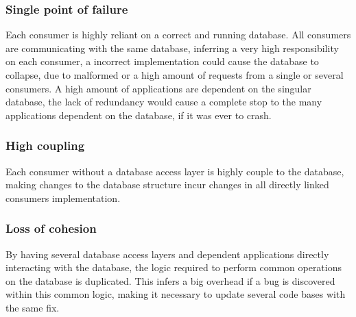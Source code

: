 
\subsubsection{Single point of failure}
Each consumer is highly reliant on a correct and running database. All consumers are communicating with the same database, inferring a very high responsibility on each consumer, a incorrect implementation could cause the database to collapse, due to malformed or a high amount of requests from a single or several consumers.
A high amount of applications are dependent on the singular database, the lack of redundancy would cause a complete stop to the many applications dependent on the database, if it was ever to crash.

\subsubsection{High coupling}
Each consumer without a database access layer is highly couple to the database, making changes to the database structure incur changes in all directly linked consumers implementation.

\subsubsection{Loss of cohesion}
By having several database access layers and dependent applications directly interacting with the database, the logic required to perform common operations on the database is duplicated. This infers a big overhead if a bug is discovered within this common logic, making it necessary to update several code bases with the same fix.



